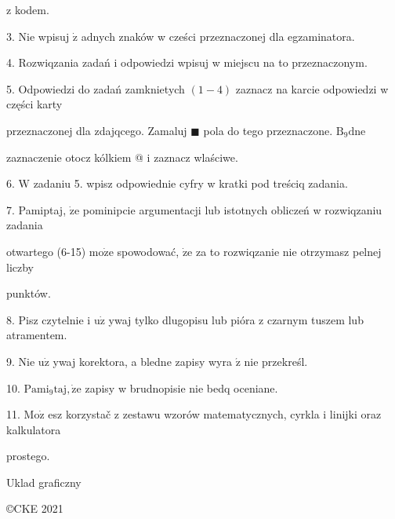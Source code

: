\documentclass[a4paper,12pt]{article}
\begin{document}
z kodem.

3. Nie wpisuj $\dot{\mathrm{z}}$ adnych znaków w cześci przeznaczonej dla egzaminatora.

4. Rozwiqzania zadań i odpowiedzi wpisuj w miejscu na to przeznaczonym.

5. Odpowiedzi do zadań zamknietych $(1-4)$ zaznacz na karcie odpowiedzi w części karty

przeznaczonej dla zdajqcego. Zamaluj $\blacksquare$ pola do tego przeznaczone. $\mathrm{B}_{9}\mathrm{d}\mathrm{n}\mathrm{e}$

zaznaczenie otocz kólkiem @ i zaznacz wlaściwe.

6. $\mathrm{W}$ zadaniu 5. wpisz odpowiednie cyfry w kratki pod treściq zadania.

7. Pamiptaj, $\dot{\mathrm{z}}\mathrm{e}$ pominipcie argumentacji lub istotnych obliczeń w rozwiqzaniu zadania

otwartego (6-15) $\mathrm{m}\mathrm{o}\dot{\mathrm{z}}\mathrm{e}$ spowodować, $\dot{\mathrm{z}}\mathrm{e}$ za to rozwiqzanie nie otrzymasz pelnej liczby

punktów.

8. Pisz czytelnie i $\mathrm{u}\dot{\mathrm{z}}$ ywaj tylko dlugopisu lub pióra z czarnym tuszem lub atramentem.

9. Nie $\mathrm{u}\dot{\mathrm{z}}$ ywaj korektora, a bledne zapisy wyra $\acute{\mathrm{z}}$ nie przekreśl.

10. $\mathrm{P}\mathrm{a}\mathrm{m}\mathrm{i}_{9}\mathrm{t}\mathrm{a}\mathrm{j}, \dot{\mathrm{z}}\mathrm{e}$ zapisy w brudnopisie nie bedq oceniane.

11. $\mathrm{M}\mathrm{o}\dot{\mathrm{z}}$ esz korzystač z zestawu wzorów matematycznych, cyrkla i linijki oraz kalkulatora

prostego.

Uklad graficzny

\copyright CKE 2021
\end{document}

